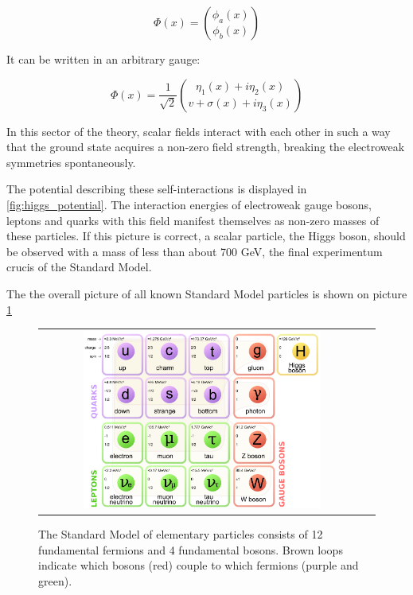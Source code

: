 \begin{equation}
\Phi(x) = \binom{\phi_{a}(x)}{\phi_{b}(x)}
\end{equation}

It can be written in an arbitrary gauge:

\begin{equation}
\Phi(x) = \dfrac{1}{\sqrt{2}}\binom{\eta_{1}(x) + i\eta_{2}(x)}{v + \sigma(x) + i\eta_{3}(x)}
\end{equation}

In this sector of the theory, scalar fields interact with each other in such a way that the ground state acquires a non-zero field strength, breaking the electroweak symmetries spontaneously. 

The potential describing these self-interactions is displayed in \ref{fig:higgs_potential}. The interaction energies of electroweak gauge bosons, leptons and quarks with this field manifest themselves as non-zero masses of these particles. If this picture is correct, a scalar particle, the Higgs boson, should be observed with a mass of less than about 700 GeV, the final experimentum crucis of the Standard Model.

The the overall picture of all known Standard Model particles is shown on picture \ref{fig:SM_particles}

\begin{figure}[tbh!]
	\centering
	
	\begin{tabular}{cc}
		\includegraphics[width=0.75\textwidth]{theory/pics/SM_particles.png}
	\end{tabular}
	\caption{The Standard Model of elementary particles consists of  12 fundamental fermions and 4 fundamental bosons. Brown loops indicate which bosons (red) couple to which fermions (purple and green).}
	\label{fig:SM_particles}
\end{figure}

